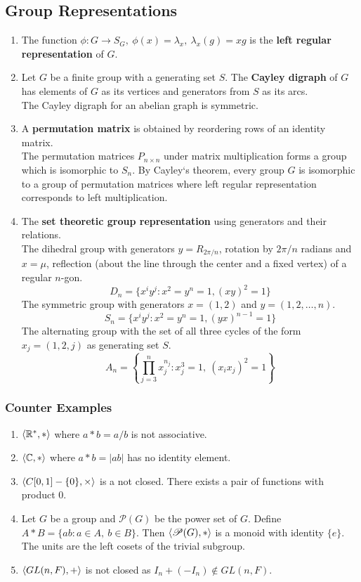 \subsection{Group Representations}
\begin{enumerate}
	\item The function $\phi : G \to S_G,\ \phi(x)=\lambda_x,\ \lambda_x(g) = xg$ is the \textbf{left regular representation} of $G$.
	\item Let $G$ be a finite group with a generating set $S$. The \textbf{Cayley digraph} of $G$ has elements of $G$ as its vertices and generators from $S$ as its arcs.\\
	The Cayley digraph for an abelian graph is symmetric.
	\item A \textbf{permutation matrix} is obtained by reordering rows of an identity matrix.\\
	The permutation matrices $P_{n \times n}$ under matrix multiplication forms a group which is isomorphic to $S_n$. By Cayley`s theorem, every group $G$ is isomorphic to a group of permutation matrices where left regular representation corresponds to left multiplication.
	\item The \textbf{set theoretic group representation} using generators and their relations.\\
	The dihedral group with generators $y=R_{2\pi/n}$, rotation by $2\pi/n$ radians and $x=\mu$, reflection (about the line through the center and a fixed vertex) of a regular $n$-gon.
	$$D_n = \{ x^iy^j : x^2=y^n=1, (xy)^2=1 \}$$
	The symmetric group with generators $x=(1,2)$ and $y=(1,2,\dots,n)$. 
	$$S_n = \{ x^iy^j : x^2=y^n=1,(yx)^{n-1}=1 \}$$
	The alternating group with the set of all three cycles of the form $x_j = (1,2,j)$ as generating set $S$.
	$$A_n = \left\{ \prod_{j=3}^n x_j^{n_j} : x_j^3=1,\ (x_ix_j)^2=1\right\}$$
\end{enumerate}

\subsubsection{Counter Examples}
\begin{enumerate}
	\item $\left\langle \mathbb{R}^\ast,\ast \right\rangle$ where $a \ast b = a/b$ is not associative.
	\item $\left\langle \mathbb{C},\ast \right\rangle$ where $a \ast b = |ab|$ has no identity element.
	\item $\left\langle C[0,1]-\{0\},\times \right\rangle$ is a not closed. There exists a pair of functions with product $0$.
	\item Let $G$ be a group and $\mathscr{P}(G)$ be the power set of $G$. Define $A \ast B = \{ ab : a \in A,\ b \in B \}$. Then $\left\langle \mathscr{P}(G),\ast \right\rangle$ is a monoid with identity $\{ e \}$. The units are the left cosets of the trivial subgroup.
	\item $\left\langle GL(n,F),+ \right\rangle$ is not closed as $I_n+(-I_n) \notin GL(n,F)$.
\end{enumerate}

